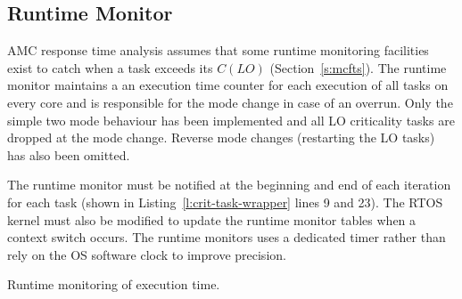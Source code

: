 \subsection{Runtime Monitor}

	AMC response time analysis assumes that some runtime monitoring facilities exist to catch when a task exceeds its $C(LO)$ (Section~\ref{s:mcfts}). 
	The runtime monitor maintains a an execution time counter for each execution of all tasks on every core and is responsible for the mode change in case of an overrun.
	Only the simple two mode behaviour has been implemented and all LO criticality tasks are dropped at the mode change. 
	Reverse mode changes (restarting the LO tasks) has also been omitted.

	The runtime monitor must be notified at the beginning and end of each iteration for each task (shown in Listing~\ref{l:crit-task-wrapper} lines 9 and 23). 
	The RTOS kernel must also be modified to update the runtime monitor tables when a context switch occurs. 
	The runtime monitors uses a dedicated timer rather than rely on the OS software clock to improve precision.

\begin{algorithm}
	\caption{Runtime monitoring of execution time.}
	\label{a:run-mon}
\end{algorithm}
 


% 
% 
% 
	



% 
% 
% 






